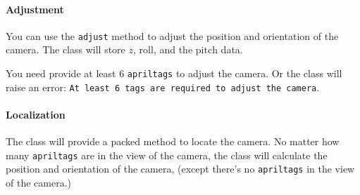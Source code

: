 \documentclass{article}
\begin{document}
\paragraph{Adjustment}

You can use the \texttt{adjust} method to adjust the position and orientation of the camera. The class will store $z$, $\mathrm{roll}$, and the $\mathrm{pitch}$ data.

You need provide at least $6$ \texttt{apriltags} to adjust the camera. Or the class will raise an error: \texttt{At least 6 tags are required to adjust the camera}.

\paragraph{Localization}

The class will provide a packed method to locate the camera. No matter how many \texttt{apriltags} are in the view of the camera, the class will calculate the position and orientation of the camera, (except there's no \texttt{apriltags} in the view of the camera.)
\end{document}

